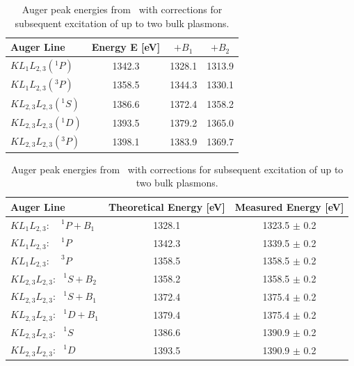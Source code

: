 \documentclass[a4paper,10pt]{scrartcl}
\begin{document}
\begin{table}
\begin{center}
\begin{tabular}{lccc}
\toprule
Auger Line                & Energy E [eV] & $+B_{1}$ & $+B_{2}$ \\
\midrule
$KL_{1}L_{2,3} (^{1}P)$   & 1342.3        & 1328.1   & 1313.9 \\
$KL_{1}L_{2,3} (^{3}P)$   & 1358.5        & 1344.3   & 1330.1 \\
$KL_{2,3}L_{2,3} (^{1}S)$ & 1386.6        & 1372.4   & 1358.2 \\
$KL_{2,3}L_{2,3} (^{1}D)$ & 1393.5        & 1379.2   & 1365.0 \\
$KL_{2,3}L_{2,3} (^{3}P)$ & 1398.1        & 1383.9   & 1369.7 \\
\bottomrule
\end{tabular}
\end{center}
\par
\caption{Auger peak energies from~\cite{augerpaper} with corrections for subsequent excitation of up to two bulk plasmons. \label{tab:augerpeakscomp}}
\end{table}

\begin{table}
\begin{center}
\begin{tabular}{lcc}
\toprule
Auger Line                                  & Theoretical Energy [eV] & Measured Energy [eV] \\
\midrule
$KL_{1}L_{2,3}: ~~\phantom{P}^{1}P + B_{1}$ & 1328.1                  & 1323.5 $\pm$ 0.2 \\
$KL_{1}L_{2,3}: ~~\phantom{P}^{1}P$         & 1342.3                  & 1339.5 $\pm$ 0.2 \\       
$KL_{1}L_{2,3}: ~~\phantom{P}^{3}P$         & 1358.5                  & 1358.5 $\pm$ 0.2 \\
$KL_{2,3}L_{2,3}: \phantom{P}^{1}S + B_{2}$ & 1358.2                  & 1358.5 $\pm$ 0.2 \\
$KL_{2,3}L_{2,3}: \phantom{P}^{1}S + B_{1}$ & 1372.4                  & 1375.4 $\pm$ 0.2 \\        
$KL_{2,3}L_{2,3}: \phantom{P}^{1}D + B_{1}$ & 1379.4                  & 1375.4 $\pm$ 0.2 \\
$KL_{2,3}L_{2,3}: \phantom{P}^{1}S$         & 1386.6                  & 1390.9 $\pm$ 0.2 \\        
$KL_{2,3}L_{2,3}: \phantom{P}^{1}D$         & 1393.5                  & 1390.9 $\pm$ 0.2 \\        
\bottomrule
\end{tabular}
\end{center}
\par
\caption{Auger peak energies from~\cite{augerpaper} with corrections for subsequent excitation of up to two bulk plasmons. \label{tab:identification}}
\end{table}
\end{document}
